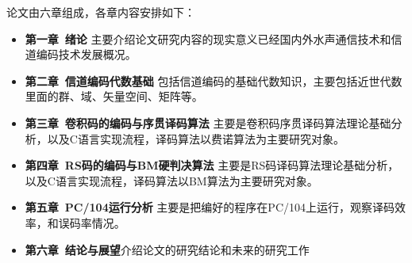 论文由六章组成，各章内容安排如下：
\begin{itemize}
  \item \textbf{第一章~绪论}\quad
    主要介绍论文研究内容的现实意义已经国内外水声通信技术和信道编码技术发展概况。
  \item \textbf{第二章~信道编码代数基础}\quad
    包括信道编码的基础代数知识，主要包括近世代数里面的群、域、矢量空间、矩阵等。
  \item \textbf{第三章~卷积码的编码与序贯译码算法}\quad
    主要是卷积码序贯译码算法理论基础分析，以及C语言实现流程，译码算法以费诺算法为主要研究对象。
  \item \textbf{第四章~RS码的编码与BM硬判决算法}\quad
    主要是RS码译码算法理论基础分析，以及C语言实现流程，译码算法以BM算法为主要研究对象。
  \item \textbf{第五章~PC/104运行分析}\quad
    主要是把编好的程序在PC/104上运行，观察译码效率，和误码率情况。
  \item \textbf{第六章~结论与展望}\quad 介绍论文的研究结论和未来的研究工作
\end{itemize}

